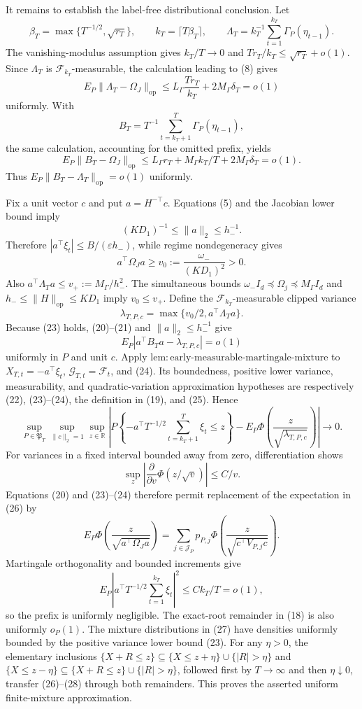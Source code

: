 It remains to establish the label-free distributional conclusion. Let
\[
 \beta_T=\max\{T^{-1/2},\sqrt{r_T}\},\qquad
 k_T=\lceil T\beta_T\rceil,\qquad
 \Lambda_T=k_T^{-1}\sum_{t=1}^{k_T}\Gamma_P(\eta_{t-1}). \tag{19}
\]
The vanishing-modulus assumption gives \(k_T/T\to0\) and \(Tr_T/k_T\le\sqrt{r_T}+o(1)\). Since \(\Lambda_T\) is \(\mathcal F_{k_T}\)-measurable, the calculation leading to (8) gives
\[
 E_P\|\Lambda_T-\Omega_J\|_{\mathrm{op}}
 \le L_\Gamma\frac{Tr_T}{k_T}+2M_\Gamma\delta_T=o(1) \tag{20}
\]
uniformly. With
\[
 B_T=T^{-1}\sum_{t=k_T+1}^T\Gamma_P(\eta_{t-1}),
\]
the same calculation, accounting for the omitted prefix, yields
\[
 E_P\|B_T-\Omega_J\|_{\mathrm{op}}
 \le L_\Gamma r_T+M_\Gamma k_T/T+2M_\Gamma\delta_T=o(1). \tag{21}
\]
Thus \(E_P\|B_T-\Lambda_T\|_{\mathrm{op}}=o(1)\) uniformly.

Fix a unit vector \(c\) and put \(a=H^{-\top}c\). Equations (5) and the Jacobian lower bound imply
\[
 (KD_1)^{-1}\le\|a\|_2\le h_-^{-1}. \tag{22}
\]
Therefore \(|a^\top\xi_t|\le B/(\varepsilon h_-)\), while regime nondegeneracy gives
\[
 a^\top\Omega_Ja\ge v_0:=\frac{\omega_-}{(KD_1)^2}>0. \tag{23}
\]
Also \(a^\top\Lambda_Ta\le v_+:=M_\Gamma/h_-^2\). The simultaneous bounds \(\omega_-I_d\preceq\Omega_j\preceq M_\Gamma I_d\) and \(h_-\le\|H\|_{\mathrm{op}}\le KD_1\) imply \(v_0\le v_+\). Define the \(\mathcal F_{k_T}\)-measurable clipped variance
\[
 \lambda_{T,P,c}=\max\{v_0/2,a^\top\Lambda_Ta\}. \tag{24}
\]
Because (23) holds, (20)--(21) and \(\|a\|_2\le h_-^{-1}\) give
\[
 E_P|a^\top B_Ta-\lambda_{T,P,c}|=o(1) \tag{25}
\]
uniformly in \(P\) and unit \(c\). Apply \(\mathrm{lem:early\text{-}measurable\text{-}martingale\text{-}mixture}\) to \(X_{T,t}=-a^\top\xi_t\), \(\mathcal G_{T,t}=\mathcal F_t\), and (24). Its boundedness, positive lower variance, measurability, and quadratic-variation approximation hypotheses are respectively (22), (23)--(24), the definition in (19), and (25). Hence
\[
 \sup_{P\in\mathfrak P_T}\sup_{\|c\|_2=1}\sup_{z\in\mathbb R}
 \left|P\left\{-a^\top T^{-1/2}\sum_{t=k_T+1}^T\xi_t\le z\right\}
 -E_P\Phi\left(\frac z{\sqrt{\lambda_{T,P,c}}}\right)\right|\to0. \tag{26}
\]
For variances in a fixed interval bounded away from zero, differentiation shows
\[
 \sup_z\left|\frac{\partial}{\partial v}\Phi(z/\sqrt v)\right|
 \le C/v.
\]
Equations (20) and (23)--(24) therefore permit replacement of the expectation in (26) by
\[
 E_P\Phi\left(\frac z{\sqrt{a^\top\Omega_Ja}}\right)
 =\sum_{j\in\mathcal J_P}p_{P,j}\Phi\left(\frac z{\sqrt{c^\top V_{P,j}c}}\right). \tag{27}
\]
Martingale orthogonality and bounded increments give
\[
 E_P\left|a^\top T^{-1/2}\sum_{t=1}^{k_T}\xi_t\right|^2
 \le Ck_T/T=o(1), \tag{28}
\]
so the prefix is uniformly negligible. The exact-root remainder in (18) is also uniformly \(o_P(1)\). The mixture distributions in (27) have densities uniformly bounded by the positive variance lower bound (23). For any \(\eta>0\), the elementary inclusions \(\{X+R\le z\}\subseteq\{X\le z+\eta\}\cup\{|R|>\eta\}\) and \(\{X\le z-\eta\}\subseteq\{X+R\le z\}\cup\{|R|>\eta\}\), followed first by \(T\to\infty\) and then \(\eta\downarrow0\), transfer (26)--(28) through both remainders. This proves the asserted uniform finite-mixture approximation.

